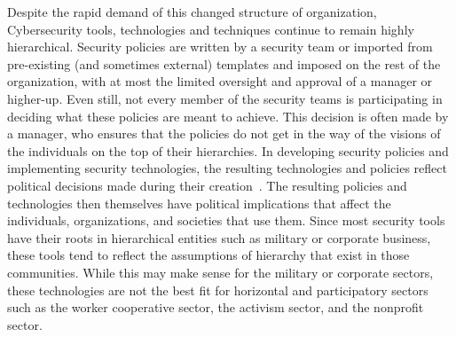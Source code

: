 
Despite the rapid demand of this changed structure of organization, 
Cybersecurity tools, technologies and techniques continue to remain highly 
hierarchical. Security policies are written by a security team or imported from
pre-existing (and sometimes external) templates and imposed on the rest of the
organization, with at most the limited oversight and approval of a manager or
higher-up. Even still, not every member of the security teams is participating
in deciding what these policies are meant to achieve. This decision is often
made by a manager, who ensures that the policies do not get in the way of the
visions of the individuals on the top of their hierarchies. In developing
security policies and implementing security technologies, the resulting
technologies and policies reflect political decisions made during their
creation~\cite{winner1980artifacts}. The resulting policies and technologies
then themselves have political implications that affect the individuals,
organizations, and societies that use them. Since most security tools have their
roots in hierarchical entities such as military or corporate business, these
tools tend to reflect the assumptions of hierarchy that exist in those
communities. While this may make sense for the military or corporate sectors,
these technologies are not the best fit for horizontal and participatory sectors
such as the worker cooperative sector, the activism sector, and the nonprofit
sector.

